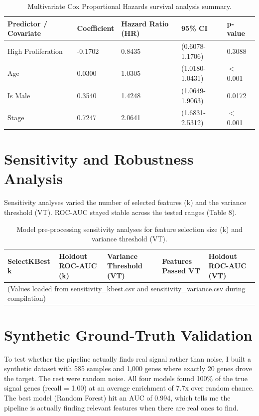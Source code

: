 \documentclass[12pt]{article}
\begin{document}
\begin{table}[H]
\centering
\caption{Multivariate Cox Proportional Hazards survival analysis summary.}
\begin{tabular}{lllll}
\toprule
Predictor / Covariate & Coefficient & Hazard Ratio (HR) & 95\% CI & p-value \\
\midrule
High Proliferation & -0.1702 & 0.8435 & (0.6078-1.1706) & 0.3088 \\
Age & 0.0300 & 1.0305 & (1.0180-1.0431) & $<$ 0.001 \\
Is Male & 0.3540 & 1.4248 & (1.0649-1.9063) & 0.0172 \\
Stage & 0.7247 & 2.0641 & (1.6831-2.5312) & $<$ 0.001 \\
\bottomrule
\end{tabular}
\end{table}

\section{Sensitivity and Robustness Analysis}

Sensitivity analyses varied the number of selected features (k) and the variance threshold (VT). ROC-AUC stayed stable across the tested ranges (Table 8).

\begin{table}[H]
\centering
\caption{Model pre-processing sensitivity analyses for feature selection size (k) and variance threshold (VT).}
\begin{tabular}{lllll}
\toprule
SelectKBest k & Holdout ROC-AUC (k) & Variance Threshold (VT) & Features Passed VT & Holdout ROC-AUC (VT) \\
\midrule
\multicolumn{5}{l}{(Values loaded from sensitivity\_kbest.csv and sensitivity\_variance.csv during compilation)} \\
\bottomrule
\end{tabular}
\end{table}

\section{Synthetic Ground-Truth Validation}

To test whether the pipeline actually finds real signal rather than noise, I built a synthetic dataset with 585 samples and 1,000 genes where exactly 20 genes drove the target. The rest were random noise. All four models found 100\% of the true signal genes (recall = 1.00) at an average enrichment of 7.7x over random chance. The best model (Random Forest) hit an AUC of 0.994, which tells me the pipeline is actually finding relevant features when there are real ones to find.
\end{document}
